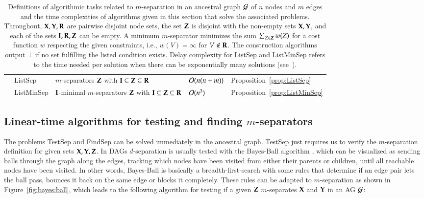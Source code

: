\begin{table*}
\begin{tabular}{lllll}
 & {\sc ListSep} 
     &$m$-separators ${\bf Z}$  with ${\bf I}\subseteq {\bf Z} \subseteq  {\bf R}$   &${\cal O}(n(n+m))$ 
     &Proposition~\ref{prop:ListSep}\\
 & {\sc ListMinSep} & $ {\bf I} $-minimal $m$-separators ${\bf Z}$  with ${\bf I} \subseteq {\bf Z} \subseteq  {\bf R}$        
     &${\cal O}(n^3)$ 
     &Proposition~\ref{prop:ListMinSep}\\
\end{tabular}
\caption{Definitions of algorithmic tasks related to $m$-separation
in an ancestral graph ${\cal G}$ of $n$ nodes and $m$ edges and the 
time complexities of algorithms given in this section that solve the associated problems. Throughout, ${\bf X},{\bf Y},{\bf R}$ are pairwise disjoint node sets, the set ${\bf Z}$ is disjoint with the non-empty sets ${\bf X},{\bf Y}$, and each of the sets ${\bf I},{\bf R},{\bf Z}$ can be empty. 
%
%
%
%
%
A minimum $m$-separator minimizes the sum $\sum_{Z\in{\bf Z}} w(Z)$ for a cost function $w$ respecting the given constraints, %
i.e., $w(V) = \infty$ for $V \notin {\bf R}$.
The construction
algorithms output $\bot$ if no set fulfilling the listed condition exists.
Delay complexity for {\sc ListSep} and {\sc ListMinSep} refers to the time needed per solution when there can be exponentially many solutions
(see~\cite{Takata2010}).}
\label{fig:problems}
\end{table*}



\subsection{Linear-time algorithms for testing and finding $m$-separators}

The problems {\sc TestSep} and {\sc FindSep} can be solved immediately in the ancestral graph.
%
{\sc TestSep} just requires us to verify the $m$-separation definition for given sets ${\bf X}, {\bf Y}, {\bf Z}$. In DAGs $d$-separation is usually tested with the Bayes-Ball algorithm \citep{Shachter1998}, which can be visualized as sending balls through the graph along the edges, tracking which nodes have been visited from either their parents or children, until all reachable nodes have been visited. In other words, Bayes-Ball is basically a breadth-first-search with some rules that determine if an edge pair lets the ball pass, bounces it back on the same edge or blocks it completely. These rules can be adapted to $ m $-separation as shown in 
%
 Figure~\ref{fig:bayes:ball}, which leads to the following algorithm for testing if 
 a given ${\bf Z}$ $m$-separates ${\bf X}$ and ${\bf Y}$ in an AG ${\cal G}$:

